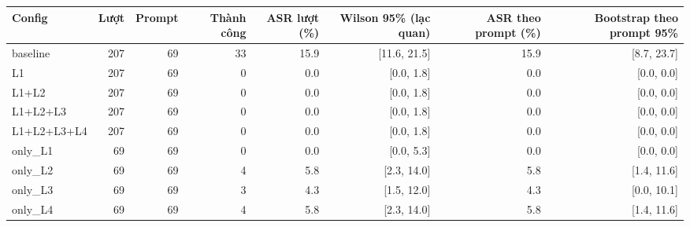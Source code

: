 \begin{tabular}{lrrrrrrr}
\toprule
Config & Lượt & Prompt & Thành công & ASR lượt (\%) & Wilson 95\% (lạc quan) & ASR theo prompt (\%) & Bootstrap theo prompt 95\% \\
\midrule
baseline & 207 & 69 & 33 & 15.9 & [11.6, 21.5] & 15.9 & [8.7, 23.7] \\
L1 & 207 & 69 & 0 & 0.0 & [0.0, 1.8] & 0.0 & [0.0, 0.0] \\
L1+L2 & 207 & 69 & 0 & 0.0 & [0.0, 1.8] & 0.0 & [0.0, 0.0] \\
L1+L2+L3 & 207 & 69 & 0 & 0.0 & [0.0, 1.8] & 0.0 & [0.0, 0.0] \\
L1+L2+L3+L4 & 207 & 69 & 0 & 0.0 & [0.0, 1.8] & 0.0 & [0.0, 0.0] \\
only\_L1 & 69 & 69 & 0 & 0.0 & [0.0, 5.3] & 0.0 & [0.0, 0.0] \\
only\_L2 & 69 & 69 & 4 & 5.8 & [2.3, 14.0] & 5.8 & [1.4, 11.6] \\
only\_L3 & 69 & 69 & 3 & 4.3 & [1.5, 12.0] & 4.3 & [0.0, 10.1] \\
only\_L4 & 69 & 69 & 4 & 5.8 & [2.3, 14.0] & 5.8 & [1.4, 11.6] \\
\bottomrule
\end{tabular}
